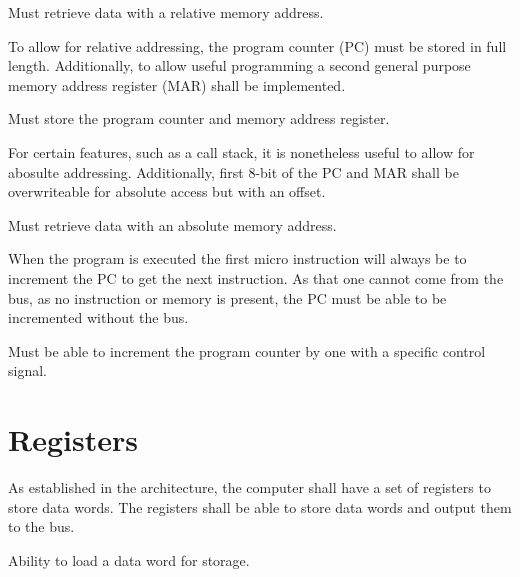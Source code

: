 \begin{feat-requirement}
Must retrieve data with a relative memory address. 
\end{feat-requirement}

To allow for relative addressing, the program counter (PC) must be stored in full length. Additionally, to allow useful programming a second general purpose memory address register (MAR) shall be implemented. %

\begin{feat-requirement}
Must store the program counter and memory address register.
\end{feat-requirement}

For certain features, such as a call stack, it is nonetheless useful to allow for abosulte addressing. Additionally, first $8$-bit of the PC and MAR shall be overwriteable for absolute access but with an offset. 

\begin{feat-requirement}
Must retrieve data with an absolute memory address. 
\end{feat-requirement}


When the program is executed the first micro instruction will always be to increment the PC to get the next instruction. As that one cannot come from the bus, as no instruction or memory is present, the PC must be able to be incremented without the bus.
\begin{feat-requirement}
    Must be able to increment the program counter by one with a specific control signal.
\end{feat-requirement}

\section{Registers}
As established in the architecture, the computer shall have a set of registers to store data words. The registers shall be able to store data words and output them to the bus.

\begin{feat-requirement}
  Ability to load a data word for storage.
\end{feat-requirement}

